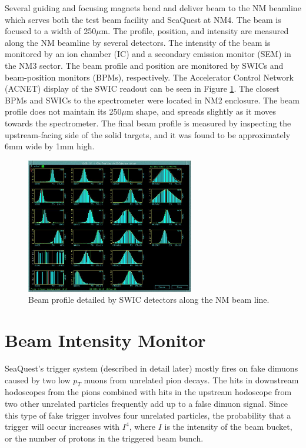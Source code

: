 Several guiding and focusing magnets bend and deliver beam to the NM beamline which serves both the test beam facility and SeaQuest at NM4.
The beam is focused to a width of 250$\mu$m. The profile, position, and intensity are measured along the NM beamline by several detectors.
The intensity of the beam is monitored by an ion chamber (IC) and a secondary emission monitor (SEM) in the NM3 sector. The beam profile
and position are monitored by SWICs and beam-position monitors (BPMs), respectively. The Accelerator Control Network
(ACNET) display of the SWIC readout can be seen in Figure \ref{fig:Profile}. The closest BPMs and SWICs to the spectrometer were
located in NM2 enclosure. The beam profile does not maintain its 250$\mu$m shape, and spreads slightly as it moves towards the
spectrometer. The final beam profile is measured by inspecting the upstream-facing side of the solid targets, and it was found
to be approximately 6mm wide by 1mm high.

\begin{figure}
	\begin{center}
		\includegraphics[width=0.65\textwidth]{figures/swic.jpg}
		\caption{Beam profile detailed by SWIC detectors along the NM beam line.}
		\label{fig:Profile}
	\end{center}
\end{figure}

\section{Beam Intensity Monitor}

SeaQuest's trigger system (described in detail later) mostly fires on fake dimuons caused by two low $p_T$ muons from
unrelated pion decays. The hits in downstream hodoscopes from the pions combined with hits in the upstream
hodoscope from two other unrelated particles frequently add up to a false dimuon signal. Since this type of fake
trigger involves four unrelated particles, the probability that a trigger will occur increases with $I^4$, where
$I$ is the intensity of the beam bucket, or the number of protons in the triggered beam bunch.

